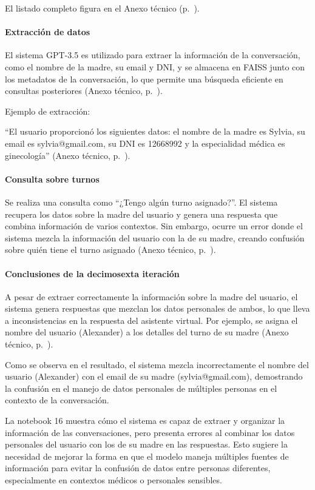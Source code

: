 El listado completo figura en el Anexo técnico (p.~\pageref{anexo:code-4-1-16-2}).

\paragraph{Extracción de datos}

El sistema GPT-3.5 es utilizado para extraer la información de la conversación, como el nombre de la madre, su email y DNI, y se almacena en FAISS junto con los metadatos de la conversación, lo que permite una búsqueda eficiente en consultas posteriores (Anexo técnico, p.~\pageref{anexo:code-4-1-16-3}).

Ejemplo de extracción:

``El usuario proporcionó los siguientes datos: el nombre de la madre es Sylvia, su email es sylvia@gmail.com, su DNI es 12668992 y la especialidad médica es ginecología'' (Anexo técnico, p.~\pageref{anexo:code-4-1-16-4}).

\paragraph{Consulta sobre turnos}

Se realiza una consulta como ``¿Tengo algún turno asignado?''. El sistema recupera los datos sobre la madre del usuario y genera una respuesta que combina información de varios contextos. Sin embargo, ocurre un error donde el sistema mezcla la información del usuario con la de su madre, creando confusión sobre quién tiene el turno asignado (Anexo técnico, p.~\pageref{anexo:code-4-1-16-5}).

\paragraph{Conclusiones de la decimosexta iteración}

A pesar de extraer correctamente la información sobre la madre del usuario, el sistema genera respuestas que mezclan los datos personales de ambos, lo que lleva a inconsistencias en la respuesta del asistente virtual. Por ejemplo, se asigna el nombre del usuario (Alexander) a los detalles del turno de su madre (Anexo técnico, p.~\pageref{anexo:code-4-1-16-6}).

Como se observa en el resultado, el sistema mezcla incorrectamente el nombre del usuario (Alexander) con el email de su madre (sylvia@gmail.com), demostrando la confusión en el manejo de datos personales de múltiples personas en el contexto de la conversación.

La notebook 16 muestra cómo el sistema es capaz de extraer y organizar la información de las conversaciones, pero presenta errores al combinar los datos personales del usuario con los de su madre en las respuestas. Esto sugiere la necesidad de mejorar la forma en que el modelo maneja múltiples fuentes de información para evitar la confusión de datos entre personas diferentes, especialmente en contextos médicos o personales sensibles. 